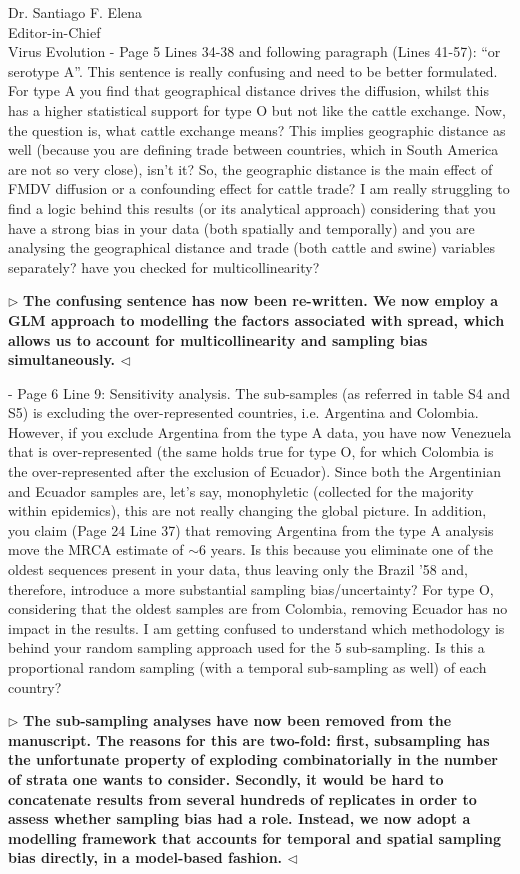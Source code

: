 \documentclass[12pt, a4paper]{letter} %
\newenvironment{reply}{$\triangleright$\bf}{$\triangleleft$}
\begin{document}
\begin{letter}{
	Dr. Santiago F. Elena\\
    Editor-in-Chief \\
    Virus Evolution
}
-       Page 5 Lines 34-38 and following paragraph (Lines 41-57): ``or serotype A''. 
This sentence is really confusing and need to be better formulated. 
For type A you find that geographical distance drives the diffusion, whilst this has a higher statistical support for type O but not like the cattle exchange. 
Now, the question is, what cattle exchange means? 
This implies geographic distance as well (because you are defining trade between countries, which in South America are not so very close), isn't it? 
So, the geographic distance is the main effect of FMDV diffusion or a confounding effect for cattle trade? 
I am really struggling to find a logic behind this results (or its analytical approach) considering that you have a strong bias in your data (both spatially and temporally) and you are analysing the geographical distance and trade (both cattle and swine) variables separately? have you checked for multicollinearity?

\begin{reply}
The confusing sentence has now been re-written.
We now employ a GLM approach to modelling the factors associated with spread, which allows us to account for multicollinearity and sampling bias simultaneously.
\end{reply}

-       Page 6 Line 9: Sensitivity analysis. 
The sub-samples (as referred in table S4 and S5) is excluding the over-represented countries, i.e. Argentina and Colombia. 
However, if you exclude Argentina from the type A data, you have now Venezuela that is over-represented (the same holds true for type O, for which Colombia is the over-represented after the exclusion of Ecuador). 
Since both the Argentinian and Ecuador samples are, let's say, monophyletic (collected for the majority within epidemics), this are not really changing the global picture. 
In addition, you claim (Page 24 Line 37) that removing Argentina from the type A analysis move the MRCA estimate of $\sim$6 years. Is this because you eliminate one of the oldest sequences present in your data, thus leaving only the Brazil '58 and, therefore, introduce a more substantial sampling bias/uncertainty? 
For type O, considering that the oldest samples are from Colombia, removing Ecuador has no impact in the results. 
I am getting confused to understand which methodology is behind your random sampling approach used for the 5 sub-sampling. Is this a proportional random sampling (with a temporal sub-sampling as well) of each country?

\begin{reply}
The sub-sampling analyses have now been removed from the manuscript.
The reasons for this are two-fold: first, subsampling has the unfortunate property of exploding combinatorially in the number of strata one wants to consider.
Secondly, it would be hard to concatenate results from several hundreds of replicates in order to assess whether sampling bias had a role.
Instead, we now adopt a modelling framework that accounts for temporal and spatial sampling bias directly, in a model-based fashion.
\end{reply}


\end{letter}
\end{document}
